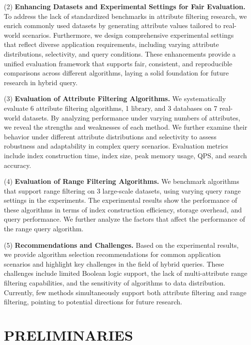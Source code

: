 \documentclass[sigconf, nonacm]{acmart}
\begin{document}
		(2) \textbf{Enhancing Datasets and Experimental Settings for Fair Evaluation.}
		To address the lack of standardized benchmarks in attribute filtering research, we enrich commonly used datasets by generating attribute values tailored to real-world scenarios. Furthermore, we design comprehensive experimental settings that reflect diverse application requirements, including varying attribute distributions, selectivity, and query conditions. These enhancements provide a unified evaluation framework that supports fair, consistent, and reproducible comparisons across different algorithms, laying a solid foundation for future research in hybrid query.
	
	
	(3)\textbf{ Evaluation of Attribute Filtering Algorithms.}
	We systematically evaluate 6 attribute filtering algorithms, 1 library, and 3 databases on 7 real-world datasets. By analyzing performance under varying numbers of attributes, we reveal the strengths and weaknesses of each method. We further examine their behavior under different attribute distributions and selectivity to assess robustness and adaptability in complex query scenarios. Evaluation metrics include index construction time, index size, peak memory usage, QPS, and search accuracy.
	
	(4)\textbf{ Evaluation of Range Filtering Algorithms.}
	We benchmark algorithms that support range filtering on 3 large-scale datasets, using varying query range settings in the experiments. The experimental results show the performance of these algorithms in terms of index construction efficiency, storage overhead, and query performance. We further analyze the factors that affect the performance of the range query algorithm.
	
	
	(5)\textbf{ Recommendations and Challenges.}
	Based on the experimental results, we provide algorithm selection recommendations for common application scenarios and highlight key challenges in the field of hybrid queries. These challenges include limited Boolean logic support, the lack of multi-attribute range filtering capabilities, and the sensitivity of algorithms to data distribution. Currently, few methods simultaneously support both attribute filtering and range filtering, pointing to potential directions for future research.
	
	\section{PRELIMINARIES}
	
\end{document}
